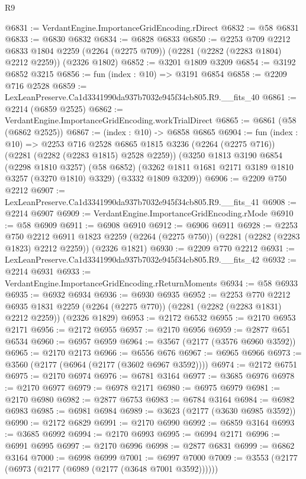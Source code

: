 \begin{lexlean}{R9}
\begin{coremodule}
@6831 := VerdantEngine.ImportanceGridEncoding.rDirect
@6832 := @58 @6831
@6833 := @6830 @6832
@6834 := @6828 @6833
@6850 := @2253
    @709
    @2212
    @6833
    @1804
    @2259
    (@2264 (@2275 @709))
    (@2281 (@2282 (@2283 @1804) @2212 @2259))
    (@2326 @1802)
@6852 := @3201 @1809 @3209
@6854 := @3192 @6852 @3215
@6856 := fun (index : @10) => @3191 @6854
@6858 := @2209 @716 @2528
@6859 := LexLeanPreserve.Ca1d3341990da937b7032e945f34cb805.R9.__fits_40
@6861 := @2214 (@6859 @2525)
@6862 := VerdantEngine.ImportanceGridEncoding.workTrialDirect
@6865 := @6861 (@58 (@6862 @2525))
@6867 := (index : @10) -> @6858 @6865
@6904 := fun (index : @10) =>
  @2253
    @716
    @2528
    @6865
    @1815
    @3236
    (@2264 (@2275 @716))
    (@2281 (@2282 (@2283 @1815) @2528 @2259))
    (@3250
      @1813
      @3190
      @6854
      (@2298 @1810 @3257)
      (@58 @6852)
      (@3262 @1811 @1681 @2171 @3189 @1810 @3257 (@3270 @1810) @3329)
      (@3332 @1809 @3209))
@6906 := @2209 @750 @2212
@6907 := LexLeanPreserve.Ca1d3341990da937b7032e945f34cb805.R9.__fits_41
@6908 := @2214 @6907
@6909 := VerdantEngine.ImportanceGridEncoding.rMode
@6910 := @58 @6909
@6911 := @6908 @6910
@6912 := @6906 @6911
@6928 := @2253
    @750
    @2212
    @6911
    @1823
    @2259
    (@2264 (@2275 @750))
    (@2281 (@2282 (@2283 @1823) @2212 @2259))
    (@2326 @1821)
@6930 := @2209 @770 @2212
@6931 := LexLeanPreserve.Ca1d3341990da937b7032e945f34cb805.R9.__fits_42
@6932 := @2214 @6931
@6933 := VerdantEngine.ImportanceGridEncoding.rReturnMoments
@6934 := @58 @6933
@6935 := @6932 @6934
@6936 := @6930 @6935
@6952 := @2253
    @770
    @2212
    @6935
    @1831
    @2259
    (@2264 (@2275 @770))
    (@2281 (@2282 (@2283 @1831) @2212 @2259))
    (@2326 @1829)
@6953 := @2172 @6532
@6955 := @2170 @6953 @2171
@6956 := @2172 @6955
@6957 := @2170 @6956
@6959 := @2877 @651 @6534
@6960 := @6957 @6959
@6964 := @3567 (@2177 (@3576 @6960 @3592))
@6965 := @2170 @2173
@6966 := @6556 @676
@6967 := @6965 @6966
@6973 := @3560 (@2177 (@6964 (@2177 (@3602 @6967 @3592))))
@6974 := @2172 @6751
@6975 := @2170 @6974
@6976 := @6781 @3164
@6977 := @3685 @6976
@6978 := @2170 @6977
@6979 := @6978 @2171
@6980 := @6975 @6979
@6981 := @2170 @6980
@6982 := @2877 @6753
@6983 := @6784 @3164
@6984 := @6982 @6983
@6985 := @6981 @6984
@6989 := @3623 (@2177 (@3630 @6985 @3592))
@6990 := @2172 @6829
@6991 := @2170 @6990
@6992 := @6859 @3164
@6993 := @3685 @6992
@6994 := @2170 @6993
@6995 := @6994 @2171
@6996 := @6991 @6995
@6997 := @2170 @6996
@6998 := @2877 @6831
@6999 := @6862 @3164
@7000 := @6998 @6999
@7001 := @6997 @7000
@7009 := @3553 (@2177 (@6973 (@2177 (@6989 (@2177 (@3648 @7001 @3592))))))

\end{coremodule}
\end{lexlean}

